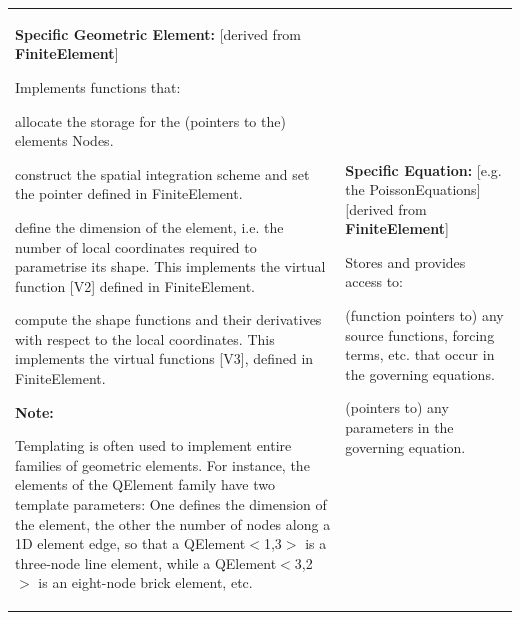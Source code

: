 \begin{center}
\begin{longtabu}
\begin{tabularx}{\linewidth}{|*{2}{>{\raggedright\arraybackslash}X|}}
\begin{center} {\bfseries Specific Geometric Element\+:}
 \mbox{[}derived from {\bfseries Finite\+Element}\mbox{]} \end{center} 
\begin{DoxyItemize}
\item Implements functions that\+:
\begin{DoxyItemize}
\item allocate the storage for the (pointers to the) element\textquotesingle{}s {\ttfamily Nodes}.
\item construct the spatial integration scheme and set the pointer defined in {\ttfamily Finite\+Element}.
\item define the dimension of the element, i.\+e. the number of local coordinates required to parametrise its shape. This implements the virtual function \mbox{[}V2\mbox{]} defined in {\ttfamily Finite\+Element}.
\item compute the shape functions and their derivatives with respect to the local coordinates. This implements the virtual functions \mbox{[}V3\mbox{]}, defined in {\ttfamily Finite\+Element}.
\end{DoxyItemize}
\end{DoxyItemize}{\bfseries Note\+:}
\begin{DoxyItemize}
\item Templating is often used to implement entire families of geometric elements. For instance, the elements of the {\ttfamily Q\+Element} family have two template parameters\+: One defines the dimension of the element, the other the number of nodes along a 1D element edge, so that a {\ttfamily Q\+Element$<$1,3$>$} is a three-\/node line element, while a {\ttfamily Q\+Element$<$3,2$>$} is an eight-\/node brick element, etc.  
\end{DoxyItemize}&\begin{center} {\bfseries Specific Equation\+:} \mbox{[}e.\+g. the {\ttfamily Poisson\+Equations}\mbox{]} ~\newline
 \mbox{[}derived from {\bfseries Finite\+Element}\mbox{]} \end{center} 
\begin{DoxyItemize}
\item Stores and provides access to\+:
\begin{DoxyItemize}
\item (function pointers to) any source functions, forcing terms, etc. that occur in the governing equations.
\item (pointers to) any parameters in the governing equation.
\end{DoxyItemize}

\end{DoxyItemize}
\end{tabularx}
\end{longtabu}
\end{center}
